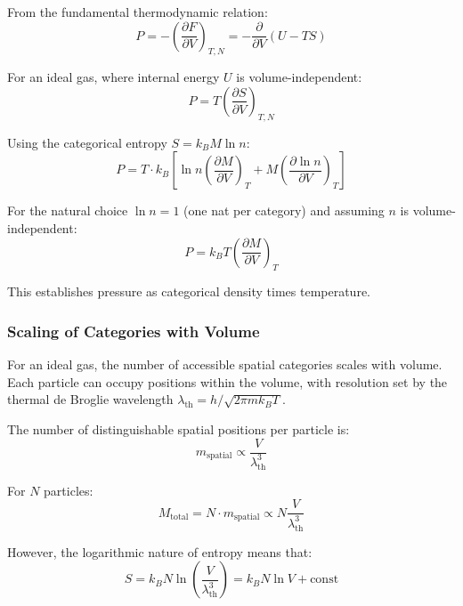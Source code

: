 From the fundamental thermodynamic relation:
\begin{equation}
P = -\left(\frac{\partial F}{\partial V}\right)_{T,N} = -\frac{\partial}{\partial V}(U - TS)
\end{equation}

For an ideal gas, where internal energy $U$ is volume-independent:
\begin{equation}
P = T\left(\frac{\partial S}{\partial V}\right)_{T,N}
\end{equation}

Using the categorical entropy $S = k_B M \ln n$:
\begin{equation}
P = T \cdot k_B \left[\ln n \left(\frac{\partial M}{\partial V}\right)_T + M \left(\frac{\partial \ln n}{\partial V}\right)_T\right]
\end{equation}

For the natural choice $\ln n = 1$ (one nat per category) and assuming $n$ is volume-independent:
\begin{equation}
P = k_B T \left(\frac{\partial M}{\partial V}\right)_T
\end{equation}

This establishes pressure as categorical density times temperature.

\subsubsection{Scaling of Categories with Volume}

For an ideal gas, the number of accessible spatial categories scales with volume. Each particle can occupy positions within the volume, with resolution set by the thermal de Broglie wavelength $\lambda_{\text{th}} = h/\sqrt{2\pi m k_B T}$.

The number of distinguishable spatial positions per particle is:
\begin{equation}
m_{\text{spatial}} \propto \frac{V}{\lambda_{\text{th}}^3}
\end{equation}

For $N$ particles:
\begin{equation}
M_{\text{total}} = N \cdot m_{\text{spatial}} \propto N \frac{V}{\lambda_{\text{th}}^3}
\end{equation}

However, the logarithmic nature of entropy means that:
\begin{equation}
S = k_B N \ln\left(\frac{V}{\lambda_{\text{th}}^3}\right) = k_B N \ln V + \text{const}
\end{equation}

